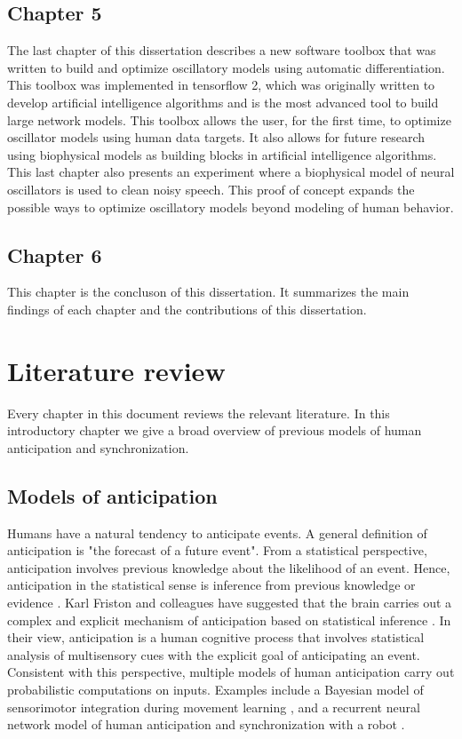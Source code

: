 \documentclass{report}
\begin{document}
\subsection{Chapter 5}
The last chapter of this dissertation describes a new software toolbox that was written to build and optimize oscillatory models using automatic differentiation. This toolbox was implemented in tensorflow 2, which was originally written to develop artificial intelligence algorithms and is the most advanced tool to build large network models. This toolbox allows the user, for the first time, to optimize oscillator models using human data targets. It also allows for future research using biophysical models as building blocks in artificial intelligence algorithms. This last chapter also presents an experiment where a biophysical model of neural oscillators is used to clean noisy speech. This proof of concept expands the possible ways to optimize oscillatory models beyond modeling of human behavior. 

\subsection{Chapter 6}
This chapter is the concluson of this dissertation. It summarizes the main findings of each chapter and the contributions of this dissertation.

\section{Literature review}

Every chapter in this document reviews the relevant literature. In this introductory chapter we give a broad overview of previous models of human anticipation and synchronization.

\subsection{Models of anticipation}
Humans have a natural tendency to anticipate events. A general definition of anticipation is "the forecast of a future event". From a statistical perspective, anticipation involves previous knowledge about the likelihood of an event. Hence, anticipation in the statistical sense is inference from previous knowledge or evidence \cite{cox2006principles}. Karl Friston and colleagues have suggested that the brain carries out a complex and explicit mechanism of anticipation based on statistical inference \cite{maffei2017perceptual}. In their view, anticipation is a human cognitive process that involves statistical analysis of multisensory cues with the explicit goal of anticipating an event. Consistent with this perspective, multiple models of human anticipation carry out probabilistic computations on inputs. Examples include a Bayesian model of sensorimotor integration during movement learning \cite{kording2004bayesian}, and a recurrent neural network model of human anticipation and synchronization with a robot \cite{schydlo2018anticipation}. 
\end{document}
